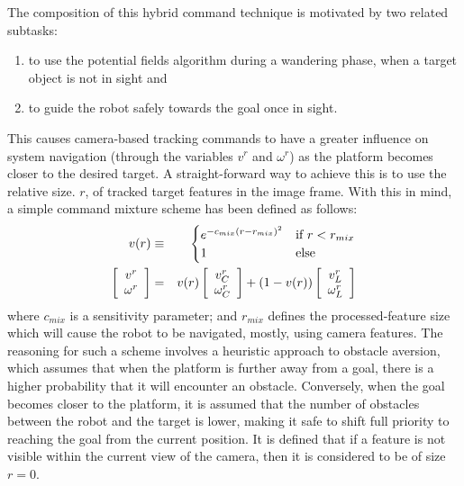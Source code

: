 			The composition of this hybrid command technique is motivated by two related subtasks: 
				\begin{enumerate}
				\item to use the potential fields algorithm during a wandering phase, when a target object is not in sight and
				\item to guide the robot safely towards the goal once in sight.
				\end{enumerate}
			This causes camera-based tracking commands to have a greater influence on system navigation (through the variables $v^{r}$ and $\omega^{r}$) as the platform becomes closer to the desired target. A straight-forward way to achieve this is to use the relative size. $r$, of tracked target features in the image frame. With this in mind, a simple command mixture scheme has been defined as follows:
			\begin{eqnarray}
				v(r) &\equiv&
				\begin{cases}
				e^{ -c_{mix} \left( r - r_{mix}\right)^{2} } 	& \text{if } r < r_{mix}	\\
				1											& \text{else}
				\end{cases}
								\nonumber \\
						\left[\begin{array}{c} v^{r} 	\\ \omega^{r} 		\end{array} \right] &=& 	
				v(r)	\left[\begin{array}{c} v^{r}_{C}\\ \omega^{r}_{C} 	\end{array} \right] + 
				(1-v(r))\left[\begin{array}{c} v^{r}_{L}\\ \omega^{r}_{L} 	\end{array} \right] 
			\end{eqnarray}
			where $c_{mix}$ is a sensitivity parameter; and $r_{mix}$ defines the processed-feature size which will cause the robot to be navigated, mostly, using camera features. The reasoning for such a scheme involves a heuristic approach to obstacle aversion, which assumes that when the platform is further away from a goal, there is a higher probability that it will encounter an obstacle. Conversely, when the goal becomes closer to the platform, it is assumed that the number of obstacles between the robot and the target is lower, making it safe to shift full priority to reaching the goal from the current position. It is defined that if a feature is not visible within the current view of the camera, then it is considered to be of size $r=0$.


